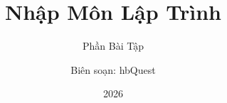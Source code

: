 
\title[Shorter Title]{Nhập Môn Lập Trình}
\subtitle{Phần Bài Tập}
\author{Biên soạn: hbQuest}
\publisher{}
\isbn{}
\website{}
\date{2026}

